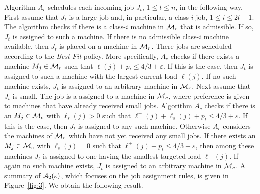 \documentclass{llncs}
\newcommand{\eps}{\varepsilon}
\begin{document}
Algorithm $A_c$ schedules each incoming job $J_t$, $1\leq t \leq n$, in the following way. First assume
that $J_t$ is a large job and, in particular, a class-$i$ job, $1\leq i \leq 2l-1$. The algorithm checks
if there is a class-$i$ machine in ${\cal M}_c$ that is admissible. If so, $J_t$ is assigned to such a machine.
If there is no admissible class-$i$ machine available, then $J_t$ is placed on a machine in ${\cal M}_r$.
There jobs are scheduled according to the {\em Best-Fit\/} policy. More specifically, $A_c$ checks if there exists
a machine $M_j\in {\cal M}_r$ such that $\ell(j) +p_t \leq 4/3+\eps$. If this is the case, then $J_t$ is
assigned to such a machine with the largest current load $\ell(j)$. If no such machine exists, $J_t$
is assigned to an arbitrary machine in ${\cal M}_r$. Next assume that $J_t$ is small. The job is a assigned
to a machine in ${\cal M}_c$, where preference is given to machines that have already received small jobs. 
Algorithm $A_c$ checks if there is an $M_j\in {\cal M}_c$ with $\ell_s(j) >0$ such that 
$\ell^+(j) + \ell_s(j) +p_t \leq 4/3+\eps$. If this is the case, then $J_t$ is assigned to any such machine.
Otherwise $A_c$ considers the machines of ${\cal M}_c$ which have not yet received any small jobs. If there exists
an $M_j\in {\cal M}_c$ with $\ell_s(j) = 0$ such that $\ell^+(j) +p_t \leq 4/3+\eps$, then among these
machines $J_t$ is assigned to one having the smallest targeted load $\ell^-(j)$. 
If again no such machine exists,  $J_t$ is assigned to an arbitrary machine in ${\cal M}_c$. A summary of  
${\cal A}_2(\eps)$, which focuses on the job assignment rules, is given in Figure~\ref{fig:3}. We obtain the following result.
\end{document}
